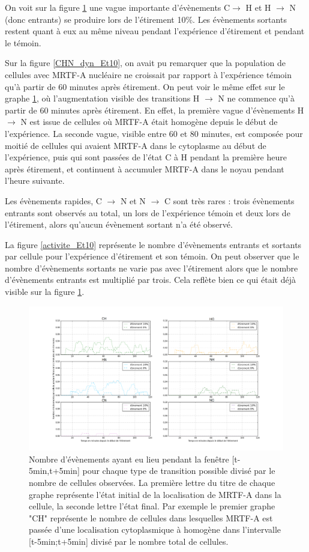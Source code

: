On voit sur la figure \ref{transloc_dyn_Et10} une vague importante d'évènements C$\rightarrow$ H et H $\rightarrow$ N (donc entrants) se produire lors de l'étirement 10\%. Les évènements sortants restent quant à eux au même niveau pendant l'expérience d'étirement et pendant le témoin. 

Sur la figure \ref{CHN_dyn_Et10}, on avait pu remarquer que la population de cellules avec MRTF-A nucléaire ne croissait par rapport à l'expérience témoin qu'à partir de 60 minutes après étirement. On peut voir le même effet sur le graphe \ref{transloc_dyn_Et10}, où l'augmentation visible des transitions H $\rightarrow$ N ne commence qu'à partir de 60 minutes après étirement. 
En effet, la première vague d'évènements H $\rightarrow$ N est issue de cellules où MRTF-A était homogène depuis le début de l'expérience. La seconde vague, visible entre 60 et 80 minutes, est composée pour moitié de cellules qui avaient MRTF-A dans le cytoplasme au début de l'expérience, puis qui sont passées de l'état C à H pendant la première heure après étirement, et continuent à accumuler MRTF-A dans le noyau pendant l'heure suivante. 

Les évènements rapides, C $\rightarrow$ N et N $\rightarrow$ C sont très rares : trois évènements entrants sont observés au total, un lors de l'expérience témoin et deux lors de l'étirement, alors qu'aucun évènement sortant n'a été observé. 

La figure \ref{activite_Et10} représente le nombre d'évènements entrants et sortants par cellule pour l'expérience d'étirement et son témoin. 
On peut observer que le nombre d'évènements sortants ne varie pas avec l'étirement alors que le nombre d'évènements entrants est multiplié par trois. Cela reflète bien ce qui était déjà visible sur la figure \ref{transloc_dyn_Et10}. 

\begin{figure}
\includegraphics[scale=0.33]{Figures/Etirement10_vs_0_translocations.png} 
\caption{\label{transloc_dyn_Et10} Nombre d'évènements ayant eu lieu pendant la fenêtre [t-5min,t+5min] pour chaque type de transition possible divisé par le nombre de cellules observées. La première lettre du titre de chaque graphe représente l'état initial de la localisation de MRTF-A dans la cellule, la seconde lettre l'état final. Par exemple le premier graphe "CH" représente le nombre de cellules dans lesquelles MRTF-A est passée d'une localisation cytoplasmique à homogène dans l'intervalle [t-5min;t+5min] divisé par le nombre total de cellules.}
\end{figure}

